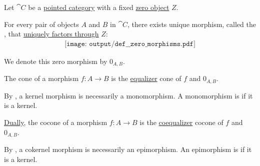 \begin{definition}\label{def:zero_morphisms}
  Let \( \cat{C} \) be a \hyperref[def:universal_objects/zero]{pointed category} with a fixed \hyperref[def:universal_objects/zero]{zero object} \( Z \).

  \begin{thmenum}
     For every pair of objects \( A \) and \( B \) in \( \cat{C} \), there exists unique morphism, called the , that \hyperref[def:factors_through]{uniquely factors through} \( Z \):
    \begin{equation}\label{eq:def:zero_morphisms/morphism}
      \begin{aligned}
        \texttt{[image: output/def\_\_zero\_morphisms.pdf]}
      \end{aligned}
    \end{equation}

    We denote this zero morphism by \( 0_{A,B} \).

     The  cone of a morphism \( f: A \to B \) is the \hyperref[eq:def:equalizers/equalizer]{equalizer} cone of \( f \) and \( 0_{A,B} \).

    By , a kernel morphism is necessarily a monomorphism. A monomorphism is  if it is a kernel.

     \hyperref[thm:categorical_principle_of_duality]{Dually}, the  cocone of a morphism \( f: A \to B \) is the \hyperref[eq:def:equalizers/coequalizer]{coequalizer} cocone of \( f \) and \( 0_{A,B} \).

    By , a cokernel morphism is necessarily an epimorphism. An epimorphism is  if it is a kernel.
  \end{thmenum}
\end{definition}

